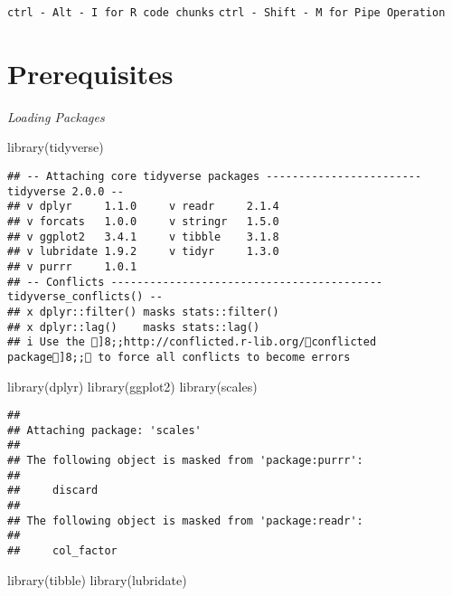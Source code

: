 \documentclass[
]{article}
\newenvironment{Shaded}{\begin{snugshade}}{\end{snugshade}}
\newcommand{\FunctionTok}[1]{\textcolor[rgb]{0.00,0.00,0.00}{#1}}
\newcommand{\NormalTok}[1]{#1}
\begin{document}
\texttt{ctrl\ -\ Alt\ -\ I\ for\ R\ code\ chunks}
\texttt{ctrl\ -\ Shift\ -\ M\ for\ Pipe\ Operation}

\hypertarget{prerequisites}{%
\section{Prerequisites}\label{prerequisites}}

\emph{Loading Packages}

\begin{Shaded}
\begin{Highlighting}[]
\FunctionTok{library}\NormalTok{(tidyverse)}
\end{Highlighting}
\end{Shaded}

\begin{verbatim}
## -- Attaching core tidyverse packages ------------------------ tidyverse 2.0.0 --
## v dplyr     1.1.0     v readr     2.1.4
## v forcats   1.0.0     v stringr   1.5.0
## v ggplot2   3.4.1     v tibble    3.1.8
## v lubridate 1.9.2     v tidyr     1.3.0
## v purrr     1.0.1     
## -- Conflicts ------------------------------------------ tidyverse_conflicts() --
## x dplyr::filter() masks stats::filter()
## x dplyr::lag()    masks stats::lag()
## i Use the ]8;;http://conflicted.r-lib.org/conflicted package]8;; to force all conflicts to become errors
\end{verbatim}

\begin{Shaded}
\begin{Highlighting}[]
\FunctionTok{library}\NormalTok{(dplyr)}
\FunctionTok{library}\NormalTok{(ggplot2)}
\FunctionTok{library}\NormalTok{(scales)}
\end{Highlighting}
\end{Shaded}

\begin{verbatim}
## 
## Attaching package: 'scales'
## 
## The following object is masked from 'package:purrr':
## 
##     discard
## 
## The following object is masked from 'package:readr':
## 
##     col_factor
\end{verbatim}

\begin{Shaded}
\begin{Highlighting}[]
\FunctionTok{library}\NormalTok{(tibble)}
\FunctionTok{library}\NormalTok{(lubridate)}
\end{Highlighting}
\end{Shaded}
\end{document}
